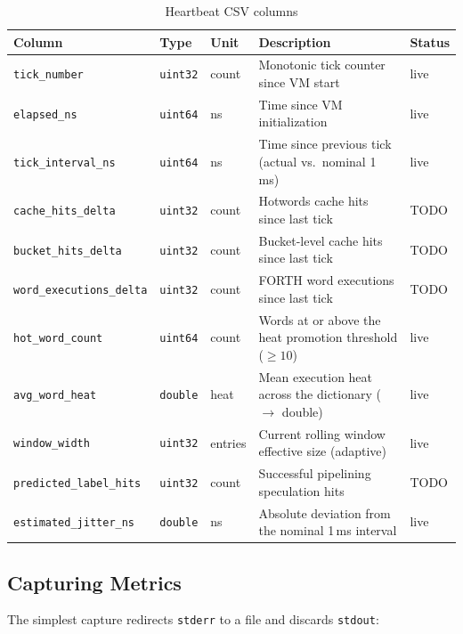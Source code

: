 \begin{table}[ht]
  \centering
  \caption{Heartbeat CSV columns}
  \label{tab:heartbeat:columns}
  \begin{tabular}{lllp{5.4cm}l}
    \toprule
    Column & Type & Unit & Description & Status \\
    \midrule
    \texttt{tick\_number}           & \texttt{uint32} & count & Monotonic tick counter since VM start & live \\
    \texttt{elapsed\_ns}            & \texttt{uint64} & ns    & Time since VM initialization & live \\
    \texttt{tick\_interval\_ns}     & \texttt{uint64} & ns    & Time since previous tick (actual vs.\ nominal 1\,ms) & live \\
    \texttt{cache\_hits\_delta}     & \texttt{uint32} & count & Hotwords cache hits since last tick & TODO \\
    \texttt{bucket\_hits\_delta}    & \texttt{uint32} & count & Bucket-level cache hits since last tick & TODO \\
    \texttt{word\_executions\_delta}& \texttt{uint32} & count & FORTH word executions since last tick & TODO \\
    \texttt{hot\_word\_count}       & \texttt{uint64} & count & Words at or above the heat promotion threshold ($\geq 10$) & live \\
    \texttt{avg\_word\_heat}        & \texttt{double} & heat  & Mean execution heat across the dictionary (\Qtype{} $\to$ double) & live \\
    \texttt{window\_width}          & \texttt{uint32} & entries & Current rolling window effective size (adaptive) & live \\
    \texttt{predicted\_label\_hits} & \texttt{uint32} & count & Successful pipelining speculation hits & TODO \\
    \texttt{estimated\_jitter\_ns}  & \texttt{double} & ns    & Absolute deviation from the nominal 1\,ms interval & live \\
    \bottomrule
  \end{tabular}
\end{table}

\subsection{Capturing Metrics}

The simplest capture redirects \texttt{stderr} to a file and discards
\texttt{stdout}:

